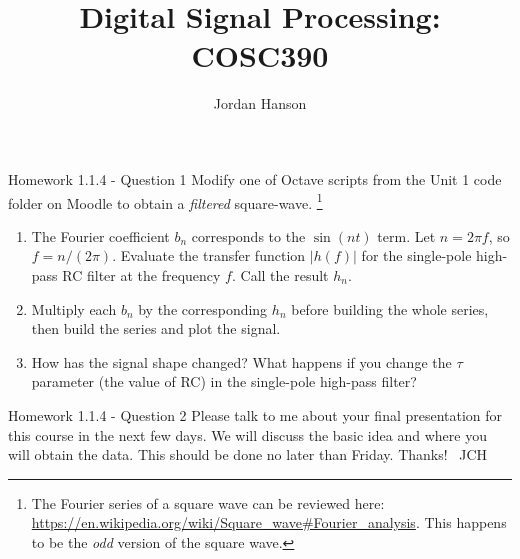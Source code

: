 \documentclass{beamer}
\title{Digital Signal Processing: COSC390}
\author{Jordan Hanson}
\institute{Whittier College Department of Physics and Astronomy}
\begin{document}
\maketitle

\begin{frame}{Homework 1.1.4 - Question 1}
\small
Modify one of Octave scripts from the Unit 1 code folder on Moodle to obtain a \textit{filtered} square-wave.  \footnote{The Fourier series of a square wave can be reviewed here: \url{https://en.wikipedia.org/wiki/Square\_wave\#Fourier_analysis}. This happens to be the \textit{odd} version of the square wave.}
\begin{enumerate}
\item The Fourier coefficient $b_n$ corresponds to the $\sin(nt)$ term.  Let $n = 2\pi f$, so $f = n/(2\pi)$.  Evaluate the transfer function $|h(f)|$ for the single-pole high-pass RC filter at the frequency $f$.  Call the result $h_n$.
\item Multiply each $b_n$ by the corresponding $h_n$ before building the whole series, then build the series and plot the signal.
\item How has the signal shape changed?  What happens if you change the $\tau$ parameter (the value of RC) in the single-pole high-pass filter?
\end{enumerate}
\end{frame}

\begin{frame}{Homework 1.1.4 - Question 2}
Please talk to me about your final presentation for this course in the next few days.  We will discuss the basic idea and where you will obtain the data.  This should be done no later than Friday.  Thanks! ~JCH
\end{frame}
\end{document}
